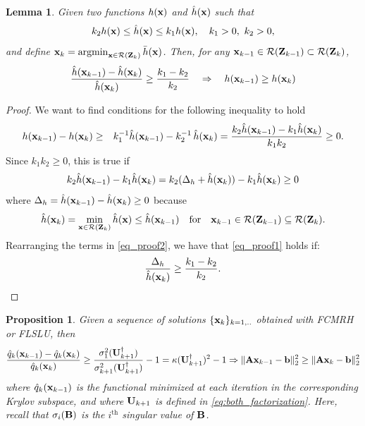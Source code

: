 \documentclass[11pt]{article}
\newtheorem{lemma}{Lemma}
\newtheorem{proposition}{Proposition}
\numberwithin{equation}{section}
\newcommand{\bfA}{{\bf A}}
\newcommand{\bfB}{{\bf B}}
\newcommand{\bfU}{{\bf U}}
\newcommand{\bfZ}{{\bf Z}}
\newcommand{\bfb}{{\bf b}}
\newcommand{\bfx}{{\bf x}}
\DeclareMathOperator*{\argmin}{argmin}
\begin{document}
\begin{lemma}\label{lemma1} Given two functions $h(\bfx)$ and $\hat h(\bfx)$ such that
\[
k_2 h(\bfx) \leq \hat h(\bfx) \leq k_1 h(\bfx), \quad k_1 > 0, \  k_2 > 0,
\]
and define $ \bfx_k=\argmin_{\bfx\in\mathcal{R}(\bfZ_k)} \bar h (\bfx)$. Then, for any $\bfx_{k-1}\in \mathcal{R}(\bfZ_{k-1}) \subset \mathcal{R}(\bfZ_k)$,
\[
\frac{\hat h(\bfx_{k-1})-\hat h(\bfx_{k})}{\hat h(\bfx_{k})} \geq\frac{k_1-k_2}{k_2} \quad  \Rightarrow \quad  h(\bfx_{k-1}) \geq h(\bfx_{k}) 
\]
\end{lemma}
\begin{proof}
We want to find conditions for the  following inequality to hold
\begin{eqnarray}\label{eq_proof1}
    h(\bfx_{k-1}) - h(\bfx_{k}) &\geq& 
k_1^{-1} \hat h(\bfx_{k-1}) - k_2^{-1}  \, \hat h(\bfx_{k})  = \frac{k_2  \hat h(\bfx_{k-1})- k_1  \hat h(\bfx_{k}) }{k_1 k_2}\geq 0.
\end{eqnarray}
Since $k_1 k_2 \geq 0$, this is true if 
\begin{equation}\label{eq_proof2}
k_2  \hat h(\bfx_{k-1})- k_1  \hat h(\bfx_{k}) = k_2  (\Delta_h +\hat h(\bfx_{k}))- k_1  \hat h(\bfx_{k}) \geq 0
\end{equation}
where  $\Delta_h = \hat h(\bfx_{k-1})-\hat h(\bfx_{k})\geq0$ because
\begin{eqnarray*}%
    \hat h(\bfx_{k}) = \min_{\bfx \in \mathcal{R}(\bfZ_{k})}\hat h(\bfx) \leq \hat h(\bfx_{k-1}) \quad \text{for} \quad \bfx_{k-1}\in\mathcal{R}(\bfZ_{k-1}) \subseteq \mathcal{R}(\bfZ_{k}). 
\end{eqnarray*}
Rearranging the terms in \eqref{eq_proof2}, we have that \eqref{eq_proof1} holds if:
\[\frac{\Delta_h}{\hat h(\bfx_{k})} \geq \frac{k_1-k_2}{k_2}.\]
\end{proof}

\begin{proposition}\label{prop1} Given a sequence of solutions $\{\bfx_k\}_{k=1,..	}$ obtained with FCMRH or FLSLU, then
\[\frac{\hat q_k(\bfx_{k-1})-\hat q_k(\bfx_{k})}{\hat q_k(\bfx_{k})} \geq \frac{\sigma_1^2(\bfU_{k+1}^{\dagger})}{\sigma_{k+1}^2(\bfU_{k+1}^{\dagger})}-1 = \kappa(\bfU_{k+1}^{\dagger})^2-1 \Rightarrow \|\bfA \bfx_{k-1} - \bfb\|_2^2 \geq \|\bfA \bfx_k - \bfb\|_2^2  \] 
where $\hat q_k(\bfx_{k-1})$ is the functional minimized at each iteration in the corresponding Krylov subspace, and where $\bfU_{k+1}$ is defined in  \eqref{eq:both_factorization}. Here, recall that $\sigma_i(\bfB)$ is the $i^{\text{th}}$ singular value of $\bfB$.
\end{proposition}
\end{document}
